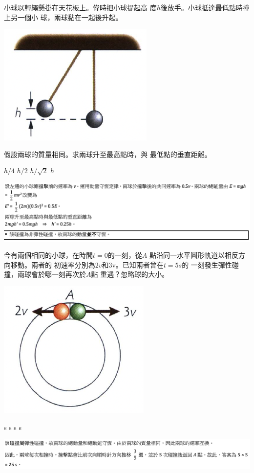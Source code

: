 {
    小球以輕繩懸掛在天花板上。偉時把小球提起高 度$h$後放手。小球抵達最低點時撞上另一個小 球，兩球黏在一起後升起。
    \par{\par\centering\includegraphics[width=.25\textwidth]{./img/ch5_momentum_mc_2024-05-11-21-48-45.png}\par}
    假設兩球的質量相同。求兩球升至最高點時，與 最低點的垂直距離。
    \begin{tasks}
        \task $h/4$
        \task $h/2$
        \task $h/\sqrt{2}$
        \task $h$
    \end{tasks}

}{
    \par{\par\centering\includegraphics[width=\textwidth]{./img/ch5_momentum_mc_2024-05-11-22-49-54.png}\par}
}

{
    今有兩個相同的小球，在時間$t=0$的一刻，從$A$ 點沿同一水平圓形軌道以相反方向移動。兩者的 初速率分別為$2v$和3v。已知兩者曾在$t=5s$的 一刻發生彈性碰撞，兩球會於哪一刻再次於$A$點 重遇？忽略球的大小。
    \par{\par\centering\includegraphics[width=.25\textwidth]{./img/ch5_momentum_mc_2024-05-11-21-51-19.png}\par}
    \begin{tasks}
         s
         s
         s
         s
    \end{tasks}

}{
    \par{\par\centering\includegraphics[width=\textwidth]{./img/ch5_momentum_mc_2024-05-11-22-49-35.png}\par}
}

